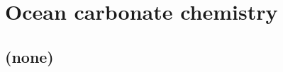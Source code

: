 
\cleardoublepage


\chapter{Ocean carbonate chemistry}\label{ch:carb-chem}

\hfill \break

\newpage

\section{(none)}

